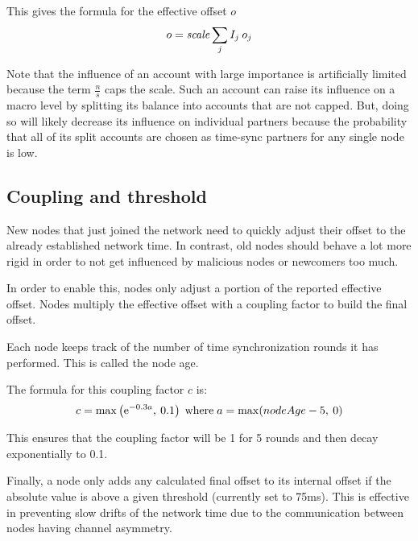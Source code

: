 This gives the formula for the effective offset $o$
$$ o = \mathit{scale} \sum_j I_j \: o_j$$

Note that the influence of an account with large importance is artificially limited because the term $\frac{n}{s} $ caps the scale.
Such an account can raise its influence on a macro level by splitting its balance into accounts that are not capped.
But, doing so will likely decrease its influence on individual partners because the probability that all of its split accounts are chosen as time-sync partners for any single node is low.

\subsection{Coupling and threshold}

New nodes that just joined the network need to quickly adjust their offset to the already established network time.
In contrast, old nodes should behave a lot more rigid in order to not get influenced by malicious nodes or newcomers too much.

In order to enable this, nodes only adjust a portion of the reported effective offset.
Nodes multiply the effective offset with a coupling factor to build the final offset.

Each node keeps track of the number of time synchronization rounds it has performed.
This is called the node age.

The formula for this coupling factor $c$ is:
$$c = \max\left(\mathrm{e}^{-0.3a},\: 0.1\right) \; \text{where} \; a = \max(nodeAge - 5,\: 0)$$

This ensures that the coupling factor will be 1 for 5 rounds and then decay exponentially to 0.1.

\begin{figure}
\end{figure}

Finally, a node only adds any calculated final offset to its internal offset if the absolute value is above a given threshold (currently set to 75ms).
This is effective in preventing slow drifts of the network time due to the communication between nodes having channel asymmetry.
